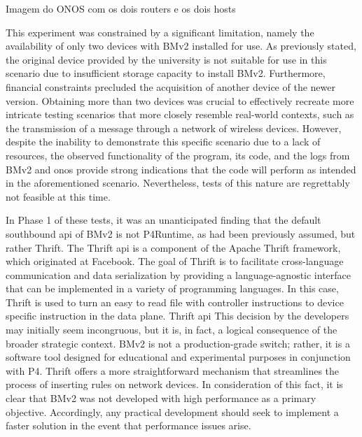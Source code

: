 Imagem do ONOS com os dois routers e os dois hosts

This experiment was constrained by a significant limitation, namely the availability of only two devices with BMv2 installed for use. As previously stated, the original device provided by the university is not suitable for use in this scenario due to insufficient storage capacity to install BMv2. Furthermore, financial constraints precluded the acquisition of another device of the newer version.
Obtaining more than two devices was crucial to effectively recreate more intricate testing scenarios that more closely resemble real-world contexts, such as the transmission of a message through a network of wireless devices. However, despite the inability to demonstrate this specific scenario due to a lack of resources, the observed functionality of the program, its code, and the logs from BMv2 and \gls{onos} provide strong indications that the code will perform as intended in the aforementioned scenario. Nevertheless, tests of this nature are regrettably not feasible at this time.

In Phase 1 of these tests, it was an unanticipated finding that the default southbound \gls{api} of BMv2 is not P4Runtime, as had been previously assumed, but rather Thrift. The Thrift \gls{api} is a component of the Apache Thrift framework, which originated at Facebook. The goal of Thrift is to facilitate cross-language communication and data serialization by providing a language-agnostic interface that can be implemented in a variety of programming languages. In this case, Thrift is used to turn an easy to read file with controller instructions to device specific instruction in the data plane. 
Thrift \gls{api}\cite{https://thrift.apache.org/}
This decision by the developers may initially seem incongruous, but it is, in fact, a logical consequence of the broader strategic context. BMv2 is not a production-grade switch; rather, it is a software tool designed for educational and experimental purposes in conjunction with P4. Thrift offers a more straightforward mechanism that streamlines the process of inserting rules on network devices. 
In consideration of this fact, it is clear that BMv2 was not developed with high performance as a primary objective. Accordingly, any practical development should seek to implement a faster solution in the event that performance issues arise.

